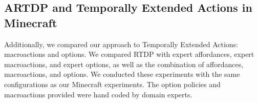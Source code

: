 \documentclass[conference]{IEEEtran}
\newcommand{\ra}[1]{\renewcommand{\arraystretch}{#1}} %
\begin{document}
\subsection{ARTDP and Temporally Extended Actions in Minecraft}
Additionally, we compared our approach to Temporally Extended Actions: 
macroactions and options. We compared RTDP with expert affordances, 
expert macroactions, and expert options, as well as the combination of 
affordances, macroactions, and options. We conducted these experiments 
with the same configurations as our Minecraft experiments. The option policies
and macroactions provided were hand coded by domain experts.


\end{document}
